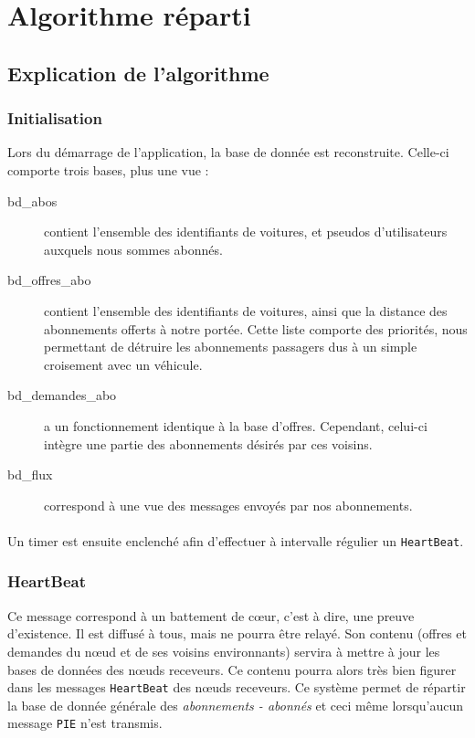 
\section{Algorithme réparti}



\subsection{Explication de l'algorithme}
\subsubsection{Initialisation}
Lors du démarrage de l'application, la base de donnée est reconstruite. Celle-ci comporte trois bases, plus une vue :
\begin{description}
	\item[bd\_abos] contient l'ensemble des identifiants de voitures, et pseudos d'utilisateurs auxquels nous sommes abonnés.
	\item[bd\_offres\_abo] contient l'ensemble des identifiants de voitures, ainsi que la distance des abonnements offerts à notre portée. Cette liste comporte des priorités, nous permettant de détruire les abonnements passagers dus à un simple croisement avec un véhicule.
	\item[bd\_demandes\_abo] a un fonctionnement identique à la base d'offres. Cependant, celui-ci intègre une partie des abonnements désirés par ces voisins.
	\item[bd\_flux] correspond à une vue des messages envoyés par nos abonnements.
\end{description}
\paragraph*{}
Un timer est ensuite enclenché afin d'effectuer à intervalle régulier un \texttt{HeartBeat}.

\subsubsection{HeartBeat}
Ce message correspond à un battement de c\oe ur, c'est à dire, une preuve d'existence. Il est diffusé à tous, mais ne pourra être relayé. Son contenu (offres et demandes du n\oe ud et de ses voisins environnants) servira à mettre à jour les bases de données des n\oe uds receveurs. Ce contenu pourra alors très bien figurer dans les messages \texttt{HeartBeat} des n\oe uds receveurs. Ce système permet de répartir la base de donnée générale des \textit{abonnements - abonnés} et ceci même lorsqu'aucun message \texttt{PIE} n'est transmis.

